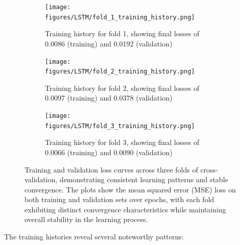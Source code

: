 \documentclass[12pt,a4paper]{report}
\begin{document}
\begin{figure}[htbp]
    \centering
    \begin{subfigure}[b]{0.6\textwidth}
        \texttt{[image: figures/LSTM/fold\_1\_training\_history.png]}
        \caption{Training history for fold 1, showing final losses of 0.0086 (training) and 0.0192 (validation)}
    \end{subfigure}
    
    \vspace{0.2cm}
    
    \begin{subfigure}[b]{0.6\textwidth}
        \texttt{[image: figures/LSTM/fold\_2\_training\_history.png]}
        \caption{Training history for fold 2, showing final losses of 0.0097 (training) and 0.0378 (validation)}
    \end{subfigure}
    
    \vspace{0.2cm}
    
    \begin{subfigure}[b]{0.6\textwidth}
        \texttt{[image: figures/LSTM/fold\_3\_training\_history.png]}
        \caption{Training history for fold 3, showing final losses of 0.0066 (training) and 0.0090 (validation)}
    \end{subfigure}
    \caption{Training and validation loss curves across three folds of cross-validation, demonstrating consistent learning patterns and stable convergence. The plots show the mean squared error (MSE) loss on both training and validation sets over epochs, with each fold exhibiting distinct convergence characteristics while maintaining overall stability in the learning process.}
    \label{fig:lstm_training}
\end{figure}

The training histories reveal several noteworthy patterns:
\end{document}
